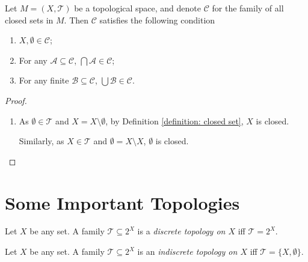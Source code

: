 \begin{theorem}
	Let $M = (X, \mathcal T)$ be a topological space, and denote $\mathcal C$ for the family of all closed sets in $M$. Then $\mathcal C$ satisfies the following condition
	\begin{enumerate}[\bf C1.]
		\item $X, \emptyset \in \mathcal C$;
		\item For any $\mathcal A \subseteq \mathcal C$, $\bigcap \mathcal A \in \mathcal C$;
		\item For any finite $\mathcal B \subseteq \mathcal C$, $\bigcup \mathcal B \in \mathcal C$.
	\end{enumerate}
	
	\begin{proof}
		\begin{enumerate}[\bf C1.]
			\item
				As $\emptyset \in \mathcal T$ and $X = X \setminus \emptyset$, by Definition \ref{definition: closed set}, $X$ is closed.
				
				Similarly, as $X \in \mathcal T$ and $\emptyset = X \setminus X$, $\emptyset$ is closed.
				
				\qedlemma
			
		\end{enumerate}
	\end{proof}
\end{theorem}


\section{Some Important Topologies}


\begin{definition}
	\label{definition: discrete topology}
	Let $X$ be any set. A family $\mathcal T \subseteq 2^X$ is a \textit{discrete topology on $X$} iff $\mathcal T = 2^X$.
\end{definition}


\begin{definition}
	\label{definition: indiscrete topology}
	Let $X$ be any set. A family $\mathcal T \subseteq 2^X$ is an \textit{indiscrete topology on $X$} iff $\mathcal T = \{X, \emptyset\}$.
\end{definition}


